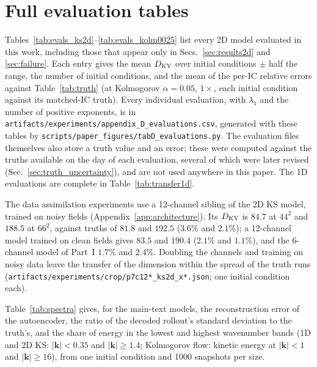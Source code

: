 \section{Full evaluation tables}
\label{app:tables}

Tables~\ref{tab:evals_ks2d}--\ref{tab:evals_kolm0025} list every 2D model
evaluated in this work, including those that appear only in
Secs.~\ref{sec:results2d} and \ref{sec:failure}. Each entry gives the mean
$D_{\mathrm{KY}}$ over initial conditions $\pm$ half the range, the number of
initial conditions, and the mean of the per-IC relative errors against
Table~\ref{tab:truth} (at Kolmogorov $\alpha=0.05$, $1\times$, each initial
condition against its matched-IC truth). Every individual evaluation,
with $\lambda_1$ and the number of positive exponents, is in
\texttt{artifacts/\allowbreak experiments/\allowbreak appendix\_D\_evaluations.csv}, generated with
these tables by \texttt{scripts/paper\_figures/tabD\_evaluations.py}. The
evaluation files themselves also store a truth value and an error; these
were computed against the truths available on the day of each
evaluation, several of which were later revised (Sec.~\ref{sec:truth_uncertainty}),
and are not used anywhere in this paper. The 1D evaluations are complete
in Table~\ref{tab:transfer1d}.

 The data assimilation experiments use a 12-channel sibling
of the 2D KS model, trained on noisy fields (Appendix~\ref{app:architecture}). Its $D_{\mathrm{KY}}$ is $84.7$ at
$44^2$ and $188.5$ at $66^2$, against truths of $81.8$ and $192.5$ ($3.6\%$ and $2.1\%$); a 12-channel model
trained on clean fields gives $83.5$ and $190.4$ ($2.1\%$ and $1.1\%$), and the 6-channel model of Part~I
$1.7\%$ and $2.4\%$. Doubling the channels and training on noisy data leave the transfer of the dimension
within the spread of the truth runs (\texttt{artifacts/experiments/crop/p7c12*\_ks2d\_x*.json}; one
initial condition each).

Table~\ref{tab:spectra} gives, for the main-text models, the
reconstruction error of the autoencoder, the ratio of the decoded
rollout's standard deviation to the truth's, and the share of energy in
the lowest and highest wavenumber bands (1D and 2D KS: $|\bm k|<0.35$ and
$|\bm k|\ge1.4$; Kolmogorov flow: kinetic energy at $|\bm k|<1$ and
$|\bm k|\ge16$), from one initial condition and 1000 snapshots per size.

